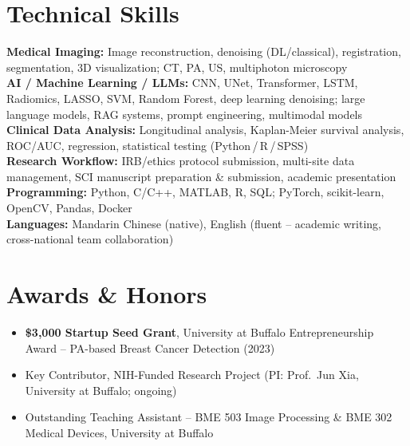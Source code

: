 \documentclass[letterpaper,10pt]{article}
\begin{document}
\section{Technical Skills}
\noindent
\small
\textbf{Medical Imaging:} Image reconstruction, denoising (DL/classical), registration, segmentation, 3D visualization; CT, PA, US, multiphoton microscopy \\
\textbf{AI / Machine Learning / LLMs:} CNN, UNet, Transformer, LSTM, Radiomics, LASSO, SVM, Random Forest, deep learning denoising; large language models, RAG systems, prompt engineering, multimodal models \\
\textbf{Clinical Data Analysis:} Longitudinal analysis, Kaplan-Meier survival analysis, ROC/AUC, regression, statistical testing (Python\,/\,R\,/\,SPSS) \\
\textbf{Research Workflow:} IRB/ethics protocol submission, multi-site data management, SCI manuscript preparation \& submission, academic presentation \\
\textbf{Programming:} Python, C/C++, MATLAB, R, SQL; PyTorch, scikit-learn, OpenCV, Pandas, Docker \\
\textbf{Languages:} Mandarin Chinese (native), English (fluent -- academic writing, cross-national team collaboration)

\vspace{-2pt}

\section{Awards \& Honors}
\begin{itemize}[leftmargin=0.2in, itemsep=1pt]
  \item \small \textbf{\$3,000 Startup Seed Grant}, University at Buffalo Entrepreneurship Award -- PA-based Breast Cancer Detection (2023)
  \item \small Key Contributor, NIH-Funded Research Project (PI: Prof.\ Jun Xia, University at Buffalo; ongoing)
  \item \small Outstanding Teaching Assistant -- BME 503 Image Processing \& BME 302 Medical Devices, University at Buffalo
\end{itemize}
\end{document}
